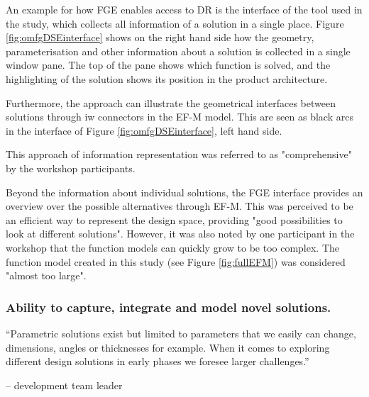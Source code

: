 \documentclass[aerospace,article,submit,moreauthors,pdftex]{Definitions/mdpi}
\begin{document}
An example for how \ac{FGE} enables access to \ac{DR} is the interface of the tool used in the study, which collects all information of a solution in a single place.
Figure \ref{fig:omfgDSEinterface} shows on the right hand side how the geometry, parameterisation and other information about a solution is collected in a single window pane.
The top of the pane shows which function is solved, and the highlighting of the solution shows its position in the product architecture.

Furthermore, the approach can illustrate the geometrical interfaces between solutions through \ac{iw} connectors in the \ac{EF-M} model.
This are seen as black arcs in the interface of Figure \ref{fig:omfgDSEinterface}, left hand side.

This approach of information representation was referred to as "comprehensive" by the workshop participants.

Beyond the information about individual solutions, the \ac{FGE} interface provides an overview over the possible alternatives through \ac{EF-M}.
This was perceived to be an efficient way to represent the design space, providing "good possibilities to look at different solutions".
However, it was also noted by one participant in the workshop that the function models can quickly grow to be too complex.
The function model created in this study (see Figure \ref{fig:fullEFM}) was considered "almost too large".





\subsubsection{Ability to capture, integrate and model novel solutions. }

\begin{center}
    “Parametric solutions exist but limited to parameters that we easily can change, dimensions, angles or thicknesses for example.  When it comes to exploring different design solutions in early phases we foresee larger challenges.” 
\end{center}
\begin{flushright}
    -- development team leader
\end{flushright}
\end{document}
